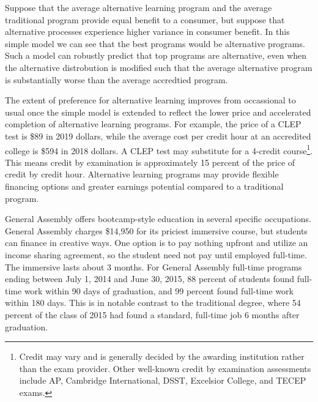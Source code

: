\documentclass[AER]{./aea-latex-templates/AEA}
\begin{document}
        Suppose that the average alternative learning program and the average traditional program
        provide equal benefit to a consumer, but suppose that alternative
        processes experience higher variance in consumer benefit. In this
        simple model we can see that the best programs would be alternative
        programs. Such a model can robustly predict that top programs are
        alternative, even when the alternative distrobution is modified such
        that the average alternative program is substantially worse than the
        average accredtied program.
        
        The extent of preference for alternative learning improves from
        occassional to usual once the simple model is extended to reflect the
        lower price and accelerated completion of alternative learning programs.
        For example, the price of a CLEP test is \$89 in 2019 dollars\cite{collegeboard_2019}, while
        the average cost per credit hour at an accredited college is \$594 in 2018
        dollars\cite{kirkham2018study}. A CLEP test may substitute for a 4-credit course\footnote{Credit
        may vary and is generally decided by the awarding institution rather than
        the exam provider. Other well-known credit by examination assessments include AP, Cambridge International, DSST, Excelsior
        College, and TECEP exams.}. This means credit by examination is approximately 15 percent of the price of credit by credit hour.
        Alternative learning programs may provide flexible financing options and greater earnings potential compared to a traditional program.
        
        General Assembly offers bootcamp-style education in several specific occupations. General Assembly
        charges \$14,950 for its priciest immersive course, but students
        can finance in creative ways. One option is to pay nothing upfront and utilize an income sharing
        agreement, so the student need not pay until employed full-time\cite{ga2019}.
        The immersive lasts about 3 months. For General Assembly
        full-time programs ending between July 1, 2014 and June 30, 2015, 88 percent of students found full-time
        work within 90 days of graduation, and 99 percent found full-time work within 180
        days\cite{kirkham_2017}. This is in notable contrast to the traditional degree, where 54 percent of
        the class of 2015 had found a standard, full-time job 6 months after
        graduation\cite{wexler_2016}.
        
\end{document}
